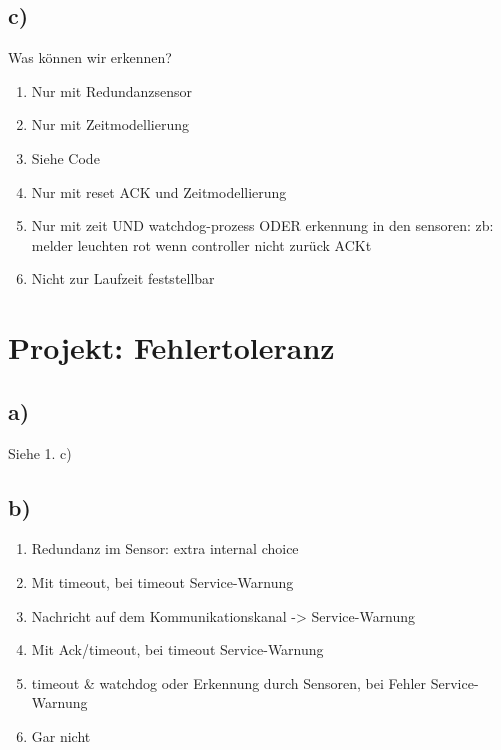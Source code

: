 \documentclass[10pt,a4paper,fleqn]{article}
\begin{document}
  \subsection*{c)}
  Was können wir erkennen?
  \begin{enumerate}[label=\arabic*.]
    \item Nur mit Redundanzsensor
    \item Nur mit Zeitmodellierung
    \item Siehe Code
    \item Nur mit reset ACK und Zeitmodellierung
    \item Nur mit zeit UND watchdog-prozess ODER erkennung in den sensoren: zb: melder leuchten rot wenn controller nicht zurück ACKt
    \item Nicht zur Laufzeit feststellbar
  \end{enumerate}

  \section*{Projekt: Fehlertoleranz}
  \subsection*{a)}
    Siehe 1. c)

  \subsection*{b)}
  \begin{enumerate}[label=\arabic*.]
    \item Redundanz im Sensor: extra internal choice
    \item Mit timeout, bei timeout Service-Warnung
    \item Nachricht auf dem Kommunikationskanal -> Service-Warnung
    \item Mit Ack/timeout, bei timeout Service-Warnung
    \item timeout \& watchdog oder Erkennung durch Sensoren, bei Fehler Service-Warnung
    \item Gar nicht
  \end{enumerate}
	
	
\end{document}
